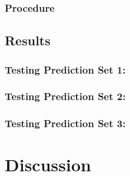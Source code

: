 \documentclass[
  english,
  ,man,floatsintext]{apa6}
\begin{document}
\hypertarget{procedure}{%
\subsubsection{Procedure}\label{procedure}}

\hypertarget{results}{%
\subsection{Results}\label{results}}

\hypertarget{testing-prediction-set-1}{%
\subsubsection{Testing Prediction Set 1:}\label{testing-prediction-set-1}}

\hypertarget{testing-prediction-set-2}{%
\subsubsection{Testing Prediction Set 2:}\label{testing-prediction-set-2}}

\hypertarget{testing-prediction-set-3}{%
\subsubsection{Testing Prediction Set 3:}\label{testing-prediction-set-3}}

\hypertarget{discussion}{%
\section{Discussion}\label{discussion}}
\end{document}

